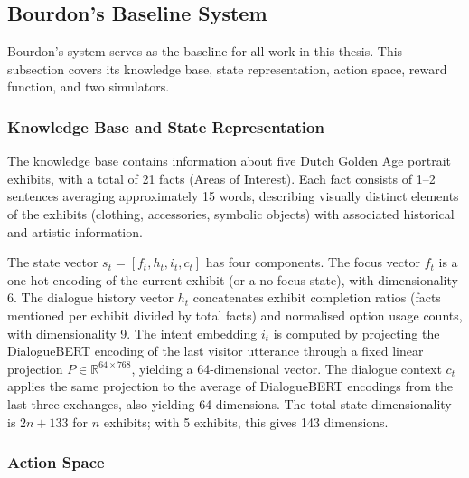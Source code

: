 \documentclass[a4paper, 11pt]{article}
\begin{document}
\subsection{Bourdon's Baseline System}
\label{sec:bg_baseline}

Bourdon's system serves as the baseline for all work in this thesis. This subsection covers its knowledge base, state representation, action space, reward function, and two simulators.

\subsubsection{Knowledge Base and State Representation}

The knowledge base contains information about five Dutch Golden Age portrait exhibits, with a total of 21 facts (Areas of Interest). Each fact consists of 1--2 sentences averaging approximately 15 words, describing visually distinct elements of the exhibits (clothing, accessories, symbolic objects) with associated historical and artistic information.

The state vector $s_t = [f_t, h_t, i_t, c_t]$ has four components. The focus vector $f_t$ is a one-hot encoding of the current exhibit (or a no-focus state), with dimensionality 6. The dialogue history vector $h_t$ concatenates exhibit completion ratios (facts mentioned per exhibit divided by total facts) and normalised option usage counts, with dimensionality 9. The intent embedding $i_t$ is computed by projecting the DialogueBERT encoding of the last visitor utterance through a fixed linear projection $P \in \mathbb{R}^{64 \times 768}$, yielding a 64-dimensional vector. The dialogue context $c_t$ applies the same projection to the average of DialogueBERT encodings from the last three exchanges, also yielding 64 dimensions. The total state dimensionality is $2n + 133$ for $n$ exhibits; with 5 exhibits, this gives 143 dimensions.

\subsubsection{Action Space}
\end{document}
